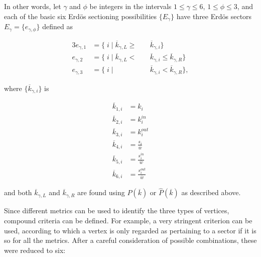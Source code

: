 \documentclass[%
	aip,
	jmp,%
	amsmath,amssymb,
	reprint,%
]{revtex4-1}
\begin{document}
In other words, let $\gamma$ and $\phi$ be integers in the intervals $1 \leq \gamma \leq 6$, $1 \leq \phi \leq 3$, and each of the basic six Erd\"os sectioning possibilities $\{E_{\gamma}\}$ have three Erd\"os sectors $E_{\gamma}= \{e_{\gamma, \phi} \}$ defined as

\begin{alignat}{3}\label{eq:part}
	e_{\gamma,1}&=\{\;i\;|\;\overline{k}_{\gamma,L}\geq&&\overline{k}_{\gamma,i}\} \nonumber \\
	e_{\gamma,2}&=\{\;i\;|\;\overline{k}_{\gamma,L}<\;&&\overline{k}_{\gamma,i}\leq\overline{k}_{\gamma,R}\} \\ 
	e_{\gamma,3}&=\{\;i\;|\;&&\overline{k}_{\gamma,i}<\overline{k}_{\gamma,R}\} \nonumber,
\end{alignat}

\noindent where $\{\overline{k}_{\gamma,i}\}$ is

\begin{equation}
	\begin{split}
		\overline{k}_{1,i}&=k_i \\
		\overline{k}_{2,i}&=k_i^{in} \\
		\overline{k}_{3,i}&=k_i^{out} \\
		\overline{k}_{4,i}&=\frac{s_i}{\overline{w}} \\
		\overline{k}_{5,i}&=\frac{s_i^{in}}{\overline{w}} \\
		\overline{k}_{6,i}&=\frac{s_i^{out}}{\overline{w}}
	\end{split}
\end{equation}

\noindent and both $\overline{k}_{\gamma,L}$ and $\overline{k}_{\gamma,R}$ are found using $P(\overline{k})$ or $\hat{P}(\overline{k})$ as described above.

Since different metrics can be used to identify the three types of vertices, compound criteria can be defined. For example, a very stringent criterion can be used, according to which a vertex is only regarded as pertaining to a sector if it is so for all the metrics. After a careful consideration of possible combinations, these were reduced to six:
\end{document}
